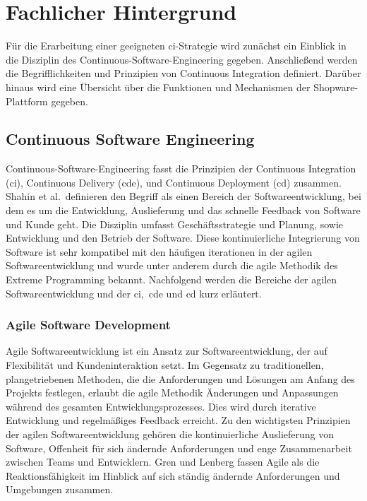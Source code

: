 
\section{Fachlicher Hintergrund} \label{sec:02-background}

Für die Erarbeitung einer geeigneten \acrshort{ci}-Strategie wird zunächst ein Einblick in die Disziplin des
Continuous-Software-Engineering gegeben.
Anschließend werden die Begrifflichkeiten und Prinzipien von Continuous Integration definiert.
Darüber hinaus wird eine Übersicht über die Funktionen und Mechanismen der Shopware-Plattform gegeben.

\subsection{Continuous Software Engineering} \label{subsec:02-background-1}

Continuous-Software-Engineering fasst die Prinzipien der Continuous Integration (\acrshort{ci}),
Continuous Delivery (\acrshort{cde}), und Continuous Deployment (\acrshort{cd}) zusammen.
Shahin et al.\ definieren den Begriff als einen Bereich der Softwareentwicklung, bei dem es um die Entwicklung,
Auslieferung und das schnelle Feedback von Software und Kunde geht.
Die Disziplin umfasst Geschäftsstrategie und Planung, sowie Entwicklung und den Betrieb der Software.
Diese kontinuierliche Integrierung von Software ist sehr kompatibel mit den häufigen iterationen in der agilen
Softwareentwicklung und wurde unter anderem durch die agile Methodik des Extreme Programming bekannt.
Nachfolgend werden die Bereiche der agilen Softwareentwicklung und der \acrshort{ci},\ \acrshort{cde} und \acrshort{cd}
kurz erläutert.

\subsubsection{Agile Software Development}

Agile Softwareentwicklung ist ein Ansatz zur Softwareentwicklung, der auf Flexibilität und Kundeninteraktion setzt.
Im Gegensatz zu traditionellen, plangetriebenen Methoden, die die Anforderungen und Lösungen am Anfang des Projekts
festlegen, erlaubt die agile Methodik Änderungen und Anpassungen während des gesamten Entwicklungsprozesses.
Dies wird durch iterative Entwicklung und regelmäßiges Feedback erreicht.
Zu den wichtigsten Prinzipien der agilen Softwareentwicklung gehören die kontinuierliche Auslieferung von Software,
Offenheit für sich ändernde Anforderungen und enge Zusammenarbeit zwischen Teams und Entwicklern.
Gren und Lenberg fassen Agile als die Reaktionsfähigkeit im Hinblick auf sich ständig ändernde Anforderungen
und Umgebungen zusammen.

